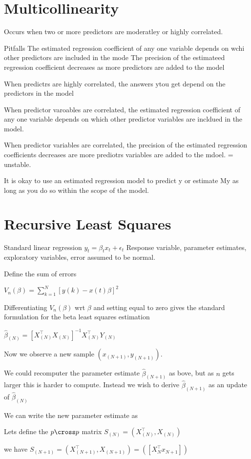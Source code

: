 \documentclass{article}
\begin{document}
 \section{Multicollinearity}

Occurs when two or more predictors are moderatley or highly correlated.

Pitfalls
The estimated regression coefficient of any one variable depends on wchi other predictors are included in the mode
The precision of the estimateed regression coefficient decreases as more predictors are added to the model

When predictrs are highly correlated, the answers ytou get depend on the predictors in the model

When predictor varoables are correlated, the estimated regression coefficient of any one variable depends on which other predictor variables are incldued in the model.

When predictor variables are correlated, the precision of the estimated regression coefficients decreases are more prediotrs variables are added to the mdoel. = unstable.

It is okay to use an estimated regression model to predict y or estimate My as long as you do so within the scope of the model. 

\section{Recursive Least Squares}

Standard linear regression
$y_t = \beta_t x_t + \epsilon_t$
Response variable, parameter estimates, exploratory variables, error assumed to be normal.

Define the sum of errors 

$V_n(\beta) = \sum_{k = 1}^N [ y(k) - x(t)\beta]^2$

Differentiating $V_n(\beta)$ wrt $\beta$ and setting equal to zero gives the standard formulation for the beta least squares estimation

$\hat{\beta}_{(N)} = [X_{(N)}^\top X_{(N)}]^{-1}X_{(N)}^\top Y_{(N)}$

Now we observe a new sample $(x_{(N+1)},y_{(N+1)})$.

We could recomputer the parameter estimate $\hat{\beta}_{(N+1)}$ as bove, but as $n$ gets larger this is harder to compute. Instead we wish to derive $\hat{\beta}_{(N+1)}$ as an update of $\hat{\beta}_{(N)} $

We can write the new parameter estimate as 

Lets define the $p \cross p$ matrix $S_{(N)} = (X^\top_{(N)},X_{(N)} )$

we have 
 $S_{(N+1)} = (X^\top_{(N+1)},X_{(N+1)} ) = ([X^\top_{N}x_{N+1}])$
\end{document}
